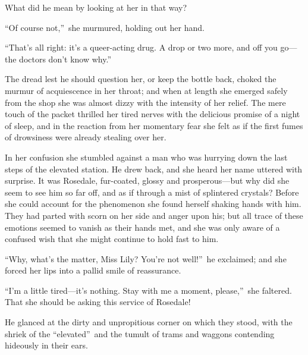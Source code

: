 \documentclass[12pt,a4paper]{book}
\begin{document}
What did he mean by looking at her in that way?





``Of course not,''\ she murmured, holding out her hand.





``That's all right: it's a queer-acting drug. A drop or two more,
and off you go---the doctors don't know why.''





The dread lest he should question her, or keep the bottle back,
choked the murmur of acquiescence in her throat; and when at
length she emerged safely from the shop she was almost dizzy with
the intensity of her relief. The mere touch of the packet
thrilled her tired nerves with the delicious promise of a night
of sleep, and in the reaction from her momentary fear she felt as
if the first fumes of drowsiness were already stealing over her.





In her confusion she stumbled against a man who was hurrying down
the last steps of the elevated station. He drew back, and she
heard her name uttered with surprise. It was Rosedale,
fur-coated, glossy and prosperous---but why did she seem to see
him so far off, and as if through a mist of splintered crystals? 
Before she could account for the phenomenon she found herself
shaking hands with him. They had parted with scorn on her side
and anger upon his; but all trace of these emotions seemed to
vanish as their hands met, and she was only aware of a confused
wish that she might continue to hold fast to him.





``Why, what's the matter, Miss Lily? You're not well!''\ he
exclaimed; and she forced her lips into a pallid smile of
reassurance.





``I'm a little tired---it's nothing. Stay with me a moment,
please,''\ she faltered. That she should be asking this service of
Rosedale!





He glanced at the dirty and unpropitious corner on which they
stood, with the shriek of the ``elevated''\ and the tumult of trams
and waggons contending hideously in their ears.
\end{document}
